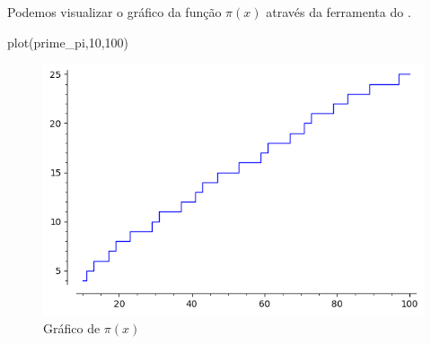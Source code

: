 Podemos visualizar o gráfico da função $\pi(x)$ através
da ferramenta  do \Sage.
\begin{sageinput}
plot(prime_pi,10,100)
\end{sageinput}
\begin{figure}[h]
  \centering
  \includegraphics[scale=0.7]{imgs/prime_plot.png}
  \caption{Gráfico de $\pi(x)$}
  \label{img:primeplot}
\end{figure}

